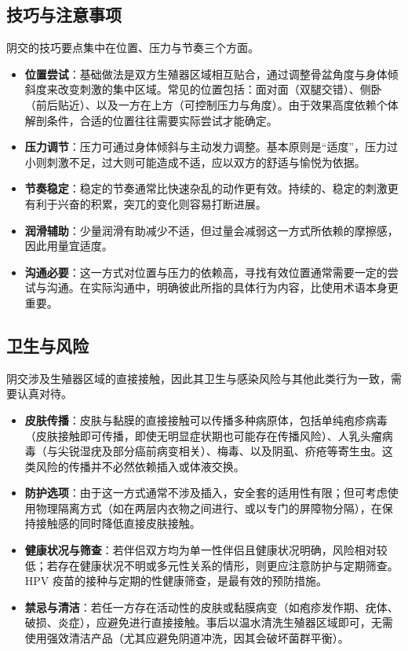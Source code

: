 \documentclass[12pt,UTF8]{ctexbook}
\begin{document}
\subsection{技巧与注意事项}

阴交的技巧要点集中在位置、压力与节奏三个方面。

\begin{itemize}
\item \textbf{位置尝试}：基础做法是双方生殖器区域相互贴合，通过调整骨盆角度与身体倾斜度来改变刺激的集中区域。常见的位置包括：面对面（双腿交错）、侧卧（前后贴近）、以及一方在上方（可控制压力与角度）。由于效果高度依赖个体解剖条件，合适的位置往往需要实际尝试才能确定。
\item \textbf{压力调节}：压力可通过身体倾斜与主动发力调整。基本原则是“适度”，压力过小则刺激不足，过大则可能造成不适，应以双方的舒适与愉悦为依据。
\item \textbf{节奏稳定}：稳定的节奏通常比快速杂乱的动作更有效。持续的、稳定的刺激更有利于兴奋的积累，突兀的变化则容易打断进展。
\item \textbf{润滑辅助}：少量润滑有助减少不适，但过量会减弱这一方式所依赖的摩擦感，因此用量宜适度。
\item \textbf{沟通必要}：这一方式对位置与压力的依赖高，寻找有效位置通常需要一定的尝试与沟通。在实际沟通中，明确彼此所指的具体行为内容，比使用术语本身更重要。
\end{itemize}

\subsection{卫生与风险}

阴交涉及生殖器区域的直接接触，因此其卫生与感染风险与其他此类行为一致，需要认真对待。

\begin{itemize}
\item \textbf{皮肤传播}：皮肤与黏膜的直接接触可以传播多种病原体，包括单纯疱疹病毒（皮肤接触即可传播，即使无明显症状期也可能存在传播风险）、人乳头瘤病毒（与尖锐湿疣及部分癌前病变相关）、梅毒、以及阴虱、疥疮等寄生虫。这类风险的传播并不必然依赖插入或体液交换。
\item \textbf{防护选项}：由于这一方式通常不涉及插入，安全套的适用性有限；但可考虑使用物理隔离方式（如在两层内衣物之间进行、或以专门的屏障物分隔），在保持接触感的同时降低直接皮肤接触。
\item \textbf{健康状况与筛查}：若伴侣双方均为单一性伴侣且健康状况明确，风险相对较低；若存在健康状况不明或多元性关系的情形，则更应注意防护与定期筛查。HPV 疫苗的接种与定期的性健康筛查，是最有效的预防措施。
\item \textbf{禁忌与清洁}：若任一方存在活动性的皮肤或黏膜病变（如疱疹发作期、疣体、破损、炎症），应避免进行直接接触。事后以温水清洗生殖器区域即可，无需使用强效清洁产品（尤其应避免阴道冲洗，因其会破坏菌群平衡）。
\end{itemize}
\end{document}
